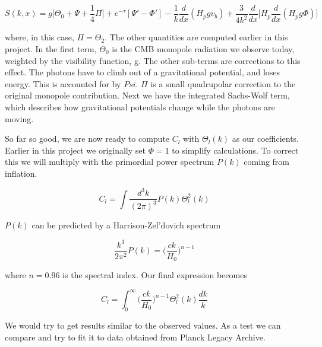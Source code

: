 \documentclass[norsk,a4paper,12pt]{article}
\begin{document}
\begin{equation}
 S(k,x) = g\bigg[\Theta_0 + \Psi + \frac{1}{4}\Pi \bigg] + e^{-\tau}[\Psi' - \Phi']-\frac{1}{k}\frac{d}{dx}(H_pgv_b) + \frac{3}{4k^2}\frac{d}{dx}\bigg[H_p\frac{d}{dx}(H_pg\Phi)\bigg]
\end{equation}

where, in this case, $\Pi = \Theta_2$. The other quantities are computed earlier in this project. In the first term, $\Theta_0$ is the CMB monopole radiation we observe today, weighted by the visibility function, g. The other sub-terms are corrections to this effect. The photons have to climb out of a gravitational potential, and loses energy. This is accounted for by $Psi$. $\Pi$ is a small quadrupolar correction to the original monopole contribution. Next we have the integrated Sachs-Wolf term, which describes how gravitational potentials change while the photons are moving.

So far so good, we are now ready to compute $C_l$ with $\Theta_l(k)$ as our coefficients. Earlier in this project we originally set $ \Phi = 1$ to simplify calculations. To correct this we will multiply with the primordial power spectrum $ P(k)$ coming from inflation. 

\begin{equation}
 C_l = \int \frac{d^3k}{(2\pi)^3}P(k)\Theta_l^2(k)
\end{equation}

$P(k)$ can be predicted by a Harrison-Zel'dovich spectrum

\begin{equation}
 \frac{k^3}{2\pi^2}P(k) = \bigg ( \frac{ck}{H_0} \bigg )^{n-1}
\end{equation}

where $n = 0.96$ is the spectral index. Our final expression becomes

\begin{equation}
 C_l = \int_0^{\infty} \bigg ( \frac{ck}{H_0} \bigg )^{n-1} \Theta_l^2(k) \frac{dk}{k}
\end{equation}

We would try to get results similar to the observed values. As a test we can compare and try to fit it to data obtained from Planck Legacy Archive. 
\end{document}
